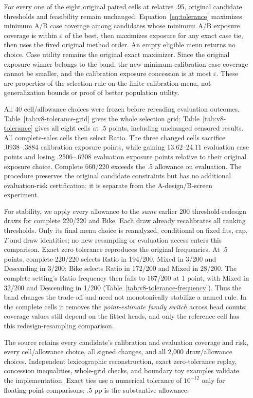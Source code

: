 For every one of the eight original paired cells at relative .95, original candidate thresholds and feasibility remain unchanged. Equation~\eqref{eq:tolerance} maximizes minimum A/B case coverage among candidates whose minimum A/B exposure coverage is within $\varepsilon$ of the best, then maximizes exposure for any exact case tie, then uses the fixed original method order. An empty eligible menu returns no choice. Case utility remains the original exact maximizer. Since the original exposure winner belongs to the band, the new minimum-calibration case coverage cannot be smaller, and the calibration exposure concession is at most $\varepsilon$. These are properties of the selection rule on the finite calibration menu, not generalization bounds or proof of better population utility.

All 40 cell/allowance choices were frozen before rereading evaluation outcomes. Table~\ref{tab:v8-tolerance-grid} gives the whole selection grid; Table~\ref{tab:v8-tolerance} gives all eight cells at .5 points, including unchanged censored results. All complete-sales cells then select Ratio. The three changed cells sacrifice .0938--.3884 calibration exposure points, while gaining 13.62--24.11 evaluation case points and losing .2506--.6208 evaluation exposure points relative to their original exposure choice. Complete 660/220 exceeds the .5 allowance on evaluation. The procedure preserves the original candidate constraints but has no additional evaluation-risk certification; it is separate from the A-design/B-screen experiment.



For stability, we apply every allowance to the \emph{same} earlier 200 threshold-redesign draws for complete 220/220 and Bike. Each draw already recalibrates all ranking thresholds. Only its final menu choice is reanalyzed, conditional on fixed fits, cap, $T$ and draw identities; no new resampling or evaluation access enters this comparison. Exact zero tolerance reproduces the original frequencies. At .5 points, complete 220/220 selects Ratio in 194/200, Mixed in 3/200 and Descending in 3/200; Bike selects Ratio in 172/200 and Mixed in 28/200. The complete setting's Ratio frequency then falls to 167/200 at 1 point, with Mixed in 32/200 and Descending in 1/200 (Table~\ref{tab:v8-tolerance-frequency}). Thus the band changes the trade-off and need not monotonically stabilize a named rule. In the complete cells it removes the \emph{point-estimate family switch} across head counts; coverage values still depend on the fitted heads, and only the reference cell has this redesign-resampling comparison.

The source retains every candidate's calibration and evaluation coverage and risk, every cell/allowance choice, all signed changes, and all 2,000 draw/allowance choices. Independent lexicographic reconstruction, exact zero-tolerance replay, concession inequalities, whole-grid checks, and boundary toy examples validate the implementation. Exact ties use a numerical tolerance of $10^{-12}$ only for floating-point comparisons; .5 pp is the substantive allowance.

